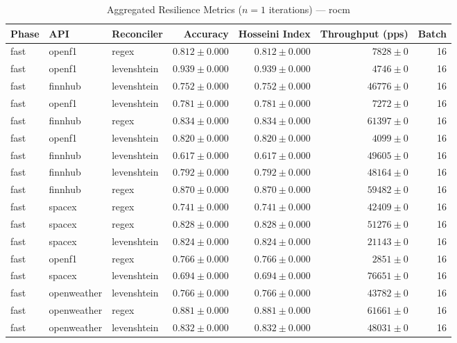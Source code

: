 
\begin{table}[htbp]
\caption{Aggregated Resilience Metrics ($n=1$ iterations) --- rocm}
\begin{tabular}{l l l r r r r}
\hline
Phase & API & Reconciler & Accuracy & Hosseini Index & Throughput (pps) & Batch \\
\hline
fast & openf1 & regex & $0.812\pm0.000$ & $0.812\pm0.000$ & $7828\pm0$ & 16 \\
fast & openf1 & levenshtein & $0.939\pm0.000$ & $0.939\pm0.000$ & $4746\pm0$ & 16 \\
fast & finnhub & levenshtein & $0.752\pm0.000$ & $0.752\pm0.000$ & $46776\pm0$ & 16 \\
fast & openf1 & levenshtein & $0.781\pm0.000$ & $0.781\pm0.000$ & $7272\pm0$ & 16 \\
fast & finnhub & regex & $0.834\pm0.000$ & $0.834\pm0.000$ & $61397\pm0$ & 16 \\
fast & openf1 & levenshtein & $0.820\pm0.000$ & $0.820\pm0.000$ & $4099\pm0$ & 16 \\
fast & finnhub & levenshtein & $0.617\pm0.000$ & $0.617\pm0.000$ & $49605\pm0$ & 16 \\
fast & finnhub & levenshtein & $0.792\pm0.000$ & $0.792\pm0.000$ & $48164\pm0$ & 16 \\
fast & finnhub & regex & $0.870\pm0.000$ & $0.870\pm0.000$ & $59482\pm0$ & 16 \\
fast & spacex & regex & $0.741\pm0.000$ & $0.741\pm0.000$ & $42409\pm0$ & 16 \\
fast & spacex & regex & $0.828\pm0.000$ & $0.828\pm0.000$ & $51276\pm0$ & 16 \\
fast & spacex & levenshtein & $0.824\pm0.000$ & $0.824\pm0.000$ & $21143\pm0$ & 16 \\
fast & openf1 & regex & $0.766\pm0.000$ & $0.766\pm0.000$ & $2851\pm0$ & 16 \\
fast & spacex & levenshtein & $0.694\pm0.000$ & $0.694\pm0.000$ & $76651\pm0$ & 16 \\
fast & openweather & levenshtein & $0.766\pm0.000$ & $0.766\pm0.000$ & $43782\pm0$ & 16 \\
fast & openweather & regex & $0.881\pm0.000$ & $0.881\pm0.000$ & $61661\pm0$ & 16 \\
fast & openweather & levenshtein & $0.832\pm0.000$ & $0.832\pm0.000$ & $48031\pm0$ & 16 \\

\end{tabular}
\end{table}
